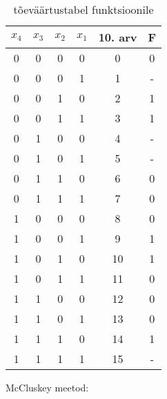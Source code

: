 \documentclass{article}
\begin{document}
\begin{table}[]
\centering
\caption{tõeväärtustabel funktsioonile}
\label{my-label}
\begin{tabular}{|c|c|c|c|c||c|}
\hline
$x_4$ & $x_3$ & $x_2$ & $x_1$ & 10. arv & F \\ \hline\hline
0  & 0  & 0  & 0  & 0       & 0 \\ \hline
0  & 0  & 0  & 1  & 1       & - \\ \hline
0  & 0  & 1  & 0  & 2       & 1 \\ \hline
0  & 0  & 1  & 1  & 3       & 1 \\ \hline
0  & 1  & 0  & 0  & 4       & - \\ \hline
0  & 1  & 0  & 1  & 5       & - \\ \hline
0  & 1  & 1  & 0  & 6       & 0 \\ \hline
0  & 1  & 1  & 1  & 7       & 0 \\ \hline
1  & 0  & 0  & 0  & 8       & 0 \\ \hline
1  & 0  & 0  & 1  & 9       & 1 \\ \hline
1  & 0  & 1  & 0  & 10      & 1 \\ \hline
1  & 0  & 1  & 1  & 11      & 0 \\ \hline
1  & 1  & 0  & 0  & 12      & 0 \\ \hline
1  & 1  & 0  & 1  & 13      & 0 \\ \hline
1  & 1  & 1  & 0  & 14      & 1 \\ \hline
1  & 1  & 1  & 1  & 15      & - \\ \hline
\end{tabular}
\end{table}
McCluskey meetod:
\end{document}
